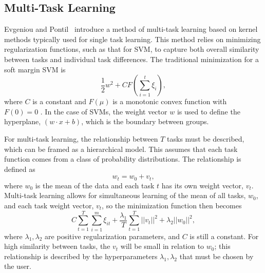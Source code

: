 \documentclass{llncs}
\begin{document}

\subsection{Multi-Task Learning}
Evgeniou and Pontil~\cite{regMTL} introduce a method of multi-task learning based on kernel methods typically used for single task learning.  This method relies on minimizing regularization functions, such as that for SVM, to capture both overall similarity between tasks and individual task differences.  The traditional minimization for a soft margin SVM is
\begin{equation}
\label{eq:svm}
\frac{1}{2}w^2 + C F\left(\sum_{i=1}^t \xi_i\right),
\end{equation}
where $C$ is a constant and $F(\mu)$ is a monotonic convex function with $F(0)=0$ \cite{svm}. In the case of SVMs, the weight vector $w$ is used to define the hyperplane, $(w \cdot x +b)$,  which is the boundary between groups.

For multi-task learning, the relationship between $T$ tasks must be described, which can be framed as a hierarchical model. This assumes that each task function comes from a class of probability distributions.  The relationship is defined as\\
\begin{equation}
\label{eq:sim}
 w_t = w_0 + v_t ,
\end{equation}
where $w_0$ is the mean of the data and each task $t$ has its own weight vector, $v_t$. Multi-task learning allows for simultaneous learning of the mean of all tasks, $w_0$, and each task weight vector, $v_t$, so the minimization function then becomes\\
\begin{equation}
\label{eq:mtlsvm}
 C \sum_{t=1}^T \sum_{i=1}^m \xi_{it} + \frac{\lambda_1}{T} \sum_{t=1}^T ||v_t||^2 + \lambda_2||w_0||^2 ,
\end{equation}
where $\lambda_1, \lambda_2$ are positive regularization parameters, and $C$ is still a constant. For high similarity between tasks, the $v_t$ will be small in relation to $w_0$; this relationship is described by the hyperparameters $\lambda_1, \lambda_2$ that must be chosen by the user.
\end{document}
